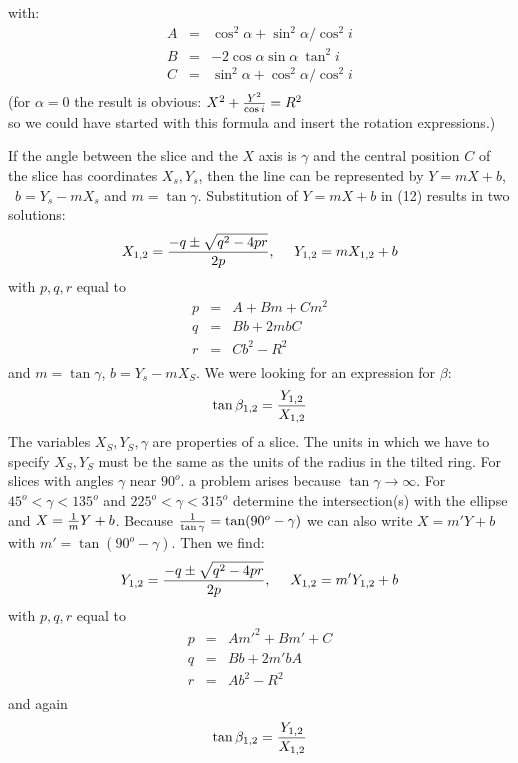 \documentclass[11pt,a4paper]{article}
\begin{document}
with:
\begin{equation}
\begin{array} {rllll}
A & = & {\cos}^2 \alpha + {\sin}^2 \alpha / {\cos}^2 i  \nonumber\\
B & = & -2 \cos \alpha \sin \alpha \ {\tan}^2 i\\
C & = & {\sin}^2 \alpha + {\cos}^2 \alpha / {\cos}^2 i  \nonumber\\
\end{array}
\end{equation}
(for $\alpha=0$ the result is obvious: $X^2+{Y^2\over{\cos i}}= R^2$\\
so we could have started with this formula and insert the rotation 
expressions.)


 
If the angle between the slice and the $X$ axis is $\gamma$ and the central
position $C$ of the slice has coordinates $X_s,Y_s$, then the line can 
be represented by $Y = mX + b$, \  $b = Y_s - m X_s$ and  
$m = \tan \gamma$.
Substitution of $Y = mX + b$ in (12) results in two solutions:
$$
X_{1,2} = {{-q \pm \sqrt{q^2-4pr}} \over{2p}}, \ \ \ \  Y_{1,2} = mX_{1,2} + b
$$
with $p,q,r$ equal to
\begin{equation}
\begin{array} {rllll}
p & = & A + Bm + C m^2  \nonumber\\
q & = & Bb + 2mbC\\
r & = & Cb^2 - R^2 \nonumber\\
\end{array}
\end{equation}
and $m = \tan \gamma$,  $b = Y_s - mX_S$.
We were looking for an expression for $\beta$: 
\begin{equation}
\tan \beta_{1,2} = {Y_{1,2}\over{X_{1,2}}}
\end{equation}
The variables $X_S, Y_S, \gamma$ are properties of a slice. The units 
in which we have to specify $X_S, Y_S$ must be the same as the units of the
radius in the tilted ring. For slices with angles $\gamma$ near $90^o$. a
problem arises because $\tan \gamma \rightarrow \infty$.
For $45^o < \gamma < 135^o$ and $225^o < \gamma < 315^o$  determine 
the intersection(s) with the ellipse and
$X = {1\over{m}}Y + b$. Because ${1\over{\tan \gamma}} = \tan (90^o-\gamma)$
we can also write $X = m' Y + b$ with $m' = \tan (90^o-\gamma)$. 
Then we find:
$$
Y_{1,2} = {{-q \pm \sqrt{q^2-4pr}} \over{2p}}, \ \ \ \  X_{1,2} = m'Y_{1,2} + b
$$
with $p,q,r$ equal to
\begin{equation}
\begin{array} {rllll}
p & = & A {m'}^2 + Bm' + C  \nonumber\\
q & = & Bb + 2m'bA\\
r & = & Ab^2 - R^2 \nonumber\\
\end{array}
\end{equation}
and again $$\tan \beta_{1,2} = {Y_{1,2}\over{X_{1,2}}}$$
 
\end{document}
